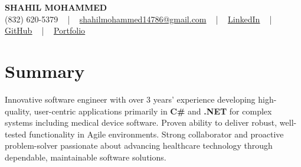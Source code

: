 \documentclass[letterpaper,10pt]{article}
\begin{document}
\begin{center}
    {\fontsize{14pt}{12pt}\selectfont \textbf{\MakeUppercase{Shahil Mohammed}}}\\ \vspace{2pt}
    \fontsize{10pt}{12pt}\selectfont (832) 620-5379 ~ | ~ \href{mailto:shahilmohammed14786@gmail.com}{shahilmohammed14786@gmail.com} ~ | ~  
    \href{https://www.linkedin.com/in/shahil-mohammed-9652931a1/}{\color{blue}\underline{LinkedIn}}  ~ | ~ 
    \href{https://github.com/freakbeast14}{\color{blue}\underline{GitHub}} ~ | ~ 
    \href{https://shahil-mohammed.netlify.app/}{\color{blue}\underline{Portfolio}}
    \vspace{-8pt}
\end{center}

\section{Summary}
\vspace{-2pt}\fontsize{8pt}{9pt}\selectfont
Innovative software engineer with over 3 years’ experience developing high-quality, user-centric applications primarily in \textbf{C\#} and \textbf{.NET} for complex systems including medical device software. Proven ability to deliver robust, well-tested functionality in Agile environments. Strong collaborator and proactive problem-solver passionate about advancing healthcare technology through dependable, maintainable software solutions.
 \vspace{-5pt}
 
\vspace{-2pt}
\end{document}
